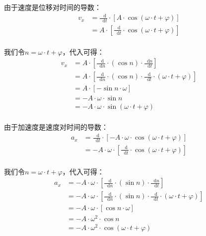 \documentclass[UTF8]{ctexart}
\newcommand*{\dif}{\mathop{}\!\mathrm{d}}
\begin{document}
    由于速度是位移对时间的导数：\vspace{5pt}
    \begin{align}
        v_x
        &=\frac{\dif}{\dif t}\cdot\left[A\cdot\cos{(\omega\cdot t+\varphi)}\right]\\[5mm]
        &=A\cdot\left[\frac{\dif}{\dif t}\cdot \cos{(\omega\cdot t+\varphi)}\right]
    \end{align}\\
    我们令$n=\omega\cdot t+\varphi$，代入可得：\vspace{5pt}
    \begin{align}
        v_x
        &=A\cdot\left[\frac{\dif}{\dif n}\cdot(\cos{n})\cdot\frac{\dif n}{\dif t}\right]\\[5mm]
        &=A\cdot\left[\frac{\dif}{\dif n}\cdot(\cos{n})\cdot\frac{\dif}{\dif t}\cdot(\omega\cdot t+\varphi)\right]\\[5mm]
        &=A\cdot\left[-\sin{n}\cdot\omega\right]\\[4mm]
        &=-A\cdot\omega\cdot\sin{n}\\[4mm]
        &=-A\cdot\omega\cdot\sin{(\omega\cdot t+\varphi)}
    \end{align}\\
    由于加速度是速度对时间的导数：\vspace{5pt}
    \begin{align}
        a_x
        &=\frac{\dif}{\dif t}\cdot\left[-A\cdot\omega\cdot\cos{(\omega\cdot t+\varphi)}\right]\\[5mm]
        &=-A\cdot\omega\cdot\left[\frac{\dif}{\dif t}\cdot \cos{(\omega\cdot t+\varphi)}\right]
    \end{align}\\
    我们令$n=\omega\cdot t+\varphi$，代入可得：\vspace{5pt}
    \begin{align}
        a_x
        &=-A\cdot\omega\cdot\left[\frac{\dif}{\dif n}\cdot(\sin{n})\cdot\frac{\dif n}{\dif t}\right]\\[5mm]
        &=-A\cdot\omega\cdot\left[\frac{\dif}{\dif n}\cdot(\sin{n})\cdot\frac{\dif}{\dif t}\cdot(\omega\cdot t+\varphi)\right]\\[5mm]
        &=-A\cdot\omega\cdot\left[\cos{n}\cdot\omega\right]\\[4mm]
        &=-A\cdot\omega^2\cdot\cos{n}\\[4mm]
        &=-A\cdot\omega^2\cdot\cos{(\omega\cdot t+\varphi)}
    \end{align}\\
\end{document}
